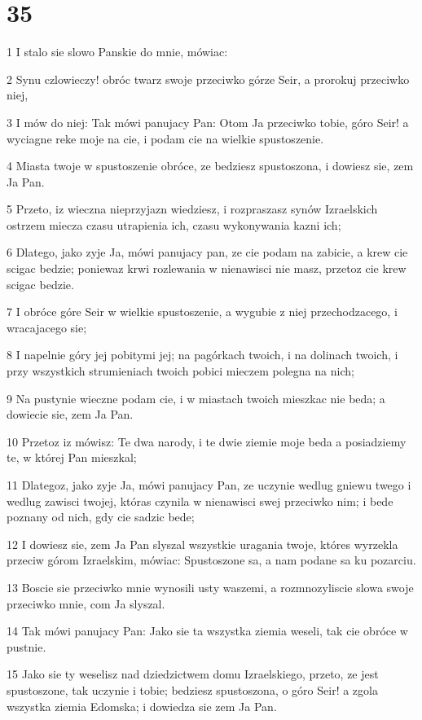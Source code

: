 \chapter{35}

\par 1 I stalo sie slowo Panskie do mnie, mówiac:
\par 2 Synu czlowieczy! obróc twarz swoje przeciwko górze Seir, a prorokuj przeciwko niej,
\par 3 I mów do niej: Tak mówi panujacy Pan: Otom Ja przeciwko tobie, góro Seir! a wyciagne reke moje na cie, i podam cie na wielkie spustoszenie.
\par 4 Miasta twoje w spustoszenie obróce, ze bedziesz spustoszona, i dowiesz sie, zem Ja Pan.
\par 5 Przeto, iz wieczna nieprzyjazn wiedziesz, i rozpraszasz synów Izraelskich ostrzem miecza czasu utrapienia ich, czasu wykonywania kazni ich;
\par 6 Dlatego, jako zyje Ja, mówi panujacy pan, ze cie podam na zabicie, a krew cie scigac bedzie; poniewaz krwi rozlewania w nienawisci nie masz, przetoz cie krew scigac bedzie.
\par 7 I obróce góre Seir w wielkie spustoszenie, a wygubie z niej przechodzacego, i wracajacego sie;
\par 8 I napelnie góry jej pobitymi jej; na pagórkach twoich, i na dolinach twoich, i przy wszystkich strumieniach twoich pobici mieczem polegna na nich;
\par 9 Na pustynie wieczne podam cie, i w miastach twoich mieszkac nie beda; a dowiecie sie, zem Ja Pan.
\par 10 Przetoz iz mówisz: Te dwa narody, i te dwie ziemie moje beda a posiadziemy te, w której Pan mieszkal;
\par 11 Dlategoz, jako zyje Ja, mówi panujacy Pan, ze uczynie wedlug gniewu twego i wedlug zawisci twojej, któras czynila w nienawisci swej przeciwko nim; i bede poznany od nich, gdy cie sadzic bede;
\par 12 I dowiesz sie, zem Ja Pan slyszal wszystkie uragania twoje, któres wyrzekla przeciw górom Izraelskim, mówiac: Spustoszone sa, a nam podane sa ku pozarciu.
\par 13 Boscie sie przeciwko mnie wynosili usty waszemi, a rozmnozyliscie slowa swoje przeciwko mnie, com Ja slyszal.
\par 14 Tak mówi panujacy Pan: Jako sie ta wszystka ziemia weseli, tak cie obróce w pustnie.
\par 15 Jako sie ty weselisz nad dziedzictwem domu Izraelskiego, przeto, ze jest spustoszone, tak uczynie i tobie; bedziesz spustoszona, o góro Seir! a zgola wszystka ziemia Edomska; i dowiedza sie zem Ja Pan.

